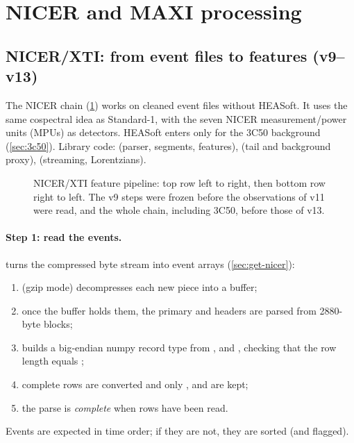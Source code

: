 \section{NICER and MAXI processing}\label{sec:nicermaxi}

\subsection{NICER/XTI: from event files to features (v9--v13)}\label{sec:nicer}
The NICER chain (\cref{fig:nicerflow}) works on cleaned event files without HEASoft. It uses the same cospectral idea
as Standard-1, with the seven NICER measurement/power units (MPUs) as detectors. HEASoft enters only for the 3C50
background (\cref{sec:3c50}). Library code:  (parser, segments, features),  (tail and
background proxy),  (streaming, Lorentzians).

\begin{figure}[htbp]
\centering

\caption{NICER/XTI feature pipeline: top row left to right, then bottom row right to left. The v9 steps were frozen before
the observations of v11 were read, and the whole chain, including 3C50, before those of v13.}\label{fig:nicerflow}
\end{figure}

\paragraph{Step 1: read the events.}  turns the compressed byte stream into event arrays
(\cref{sec:get-nicer}):
\begin{enumerate}
\item {} (gzip mode) decompresses each new piece into a buffer;
\item once the buffer holds them, the primary and  headers are parsed from 2880-byte blocks;
\item {} builds a big-endian numpy record type from ,  and , checking
that the row length equals ;
\item complete rows are converted and only ,  and  are kept;
\item the parse is \emph{complete} when  rows have been read.
\end{enumerate}
Events are expected in time order; if they are not, they are sorted (and flagged).


